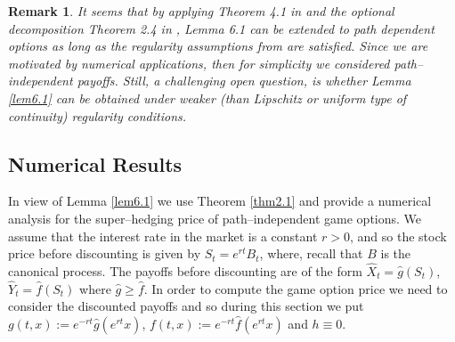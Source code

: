\documentclass{amsart}
\newtheorem{rem}[thm]{Remark}
\numberwithin{equation}{section}
\begin{document}
\begin{rem}
It seems that by applying Theorem 4.1 in \cite{BY} and the optional decomposition Theorem 2.4 in \cite{Nu}, Lemma 6.1 can be extended to path dependent options as long
as the regularity assumptions from \cite{BY} are satisfied. Since we are motivated by numerical applications, then for simplicity
we considered path--independent payoffs.
Still, a challenging open question, is whether Lemma \ref{lem6.1} can be
obtained under weaker (than Lipschitz or uniform type of continuity) regularity conditions.
\end{rem}

\subsection{Numerical Results}
In view of Lemma \ref{lem6.1} we use Theorem \ref{thm2.1} and provide a numerical analysis for
the super--hedging price of path--independent game options.
We assume that the interest rate in the market is a constant $r>0$, and so the stock price before discounting is
given by $S_t=e^{rt} B_t$, where, recall that $B$ is
the canonical process.
The payoffs before discounting are of the form
$\hat X_t=\hat g(S_t)$, $\hat Y_t=\hat f(S_t)$
where $\hat g\geq \hat f$. In order to compute the game option price we need to consider the discounted payoffs and so
during this section we put
$g(t,x):=e^{-rt}\hat g(e^{rt} x)$, $f(t,x):=e^{-rt}\hat f(e^{rt} x)$ and
$h\equiv 0$.
\end{document}
